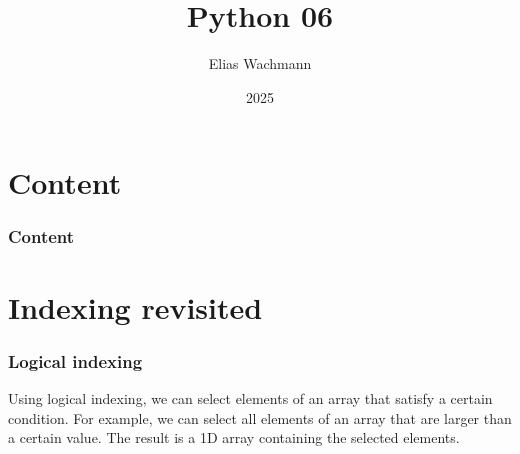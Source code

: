 \documentclass{beamer}
\title[]
{Python 06}
\author[E.~Wachmann]{\scriptsize Elias Wachmann
}
\date{2025} %
\institute[Institute of Theoretical and Computational Physics]
{
}
\begin{document}
\titleframe


\section*{Content}

\begin{frame}
\frametitle{Content}
  \tableofcontents
\end{frame}

\section{Indexing revisited}
\begin{frame}
  \frametitle{Logical indexing}
  Using logical indexing, we can select elements of an array that satisfy a certain condition. For example, we can select all elements of an array that are larger than a certain value. The result is a 1D array containing the selected elements. 
  
\end{frame}
\end{document}
